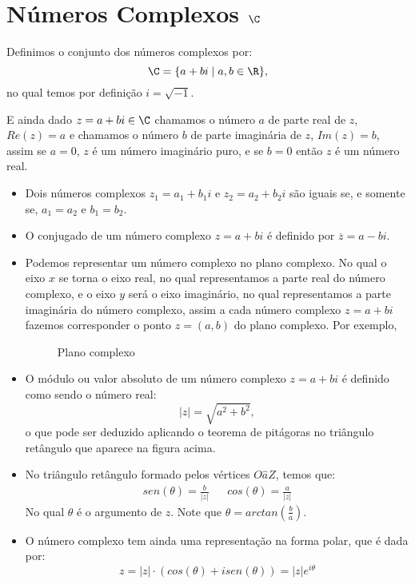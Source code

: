  \chapter{Números Complexos {$\C$}}

 \vskip0.3cm
 \colorbox{azul}{
 \begin{minipage}{14.5cm}
 \begin{center}
  Definimos o conjunto dos números complexos por:
 \[\C= \{a + bi \mid a, b \in \R \} ,\]
 no qual temos por definição $i= \sqrt{-1}$.
 \end{center}
 \end{minipage}}
 \vskip0.3cm

 E ainda dado $z= a+bi \in \C$ chamamos o número $a$ de parte real de $z$, $Re(z)= a$ e chamamos o número $b$ de parte imaginária de $z$, $Im(z)= b$, assim se $a=0$, $z$ é um número imaginário puro, e se $b=0$ então $z$ é um número real.

 \begin{defi}
 \begin{itemize}
 \item Dois números complexos $z_1= a_1 + b_1i$ e $z_2= a_2 + b_2i$ são iguais se, e somente se, $a_1=a_2$ e $b_1= b_2$.
 \item O conjugado de um número complexo $z= a+bi$ é definido por $\overline{z}= a - bi$.
 \item Podemos representar um número complexo no plano complexo. No qual o eixo $x$ se torna o eixo real, no qual representamos a parte real do número complexo, e o eixo $y$ será o eixo imaginário, no qual representamos a parte imaginária do número complexo, assim a cada número complexo $z= a+bi$ fazemos corresponder o ponto $z= (a, b)$ do plano complexo. Por exemplo,

 \begin{figure}[H]
   \centering
   \caption{Plano complexo}
  \end{figure}

 \item O módulo ou valor absoluto de um número complexo $z= a+bi$ é definido como sendo o número real:
 \[|z|= \sqrt{a^2 + b^2},\]
 o que pode ser deduzido aplicando o teorema de pitágoras no triângulo retângulo que aparece na figura acima.
 \item No triângulo retângulo formado pelos vértices $O\hat{a}Z$, temos que:
  \begin{align*}
 & sen(\theta)= \frac{b}{|z|} & & cos(\theta)= \frac{a}{|z|} &
 \end{align*}
 No qual $\theta$ é o argumento de $z$. Note que $\theta= arctan \left( \frac{b}{a} \right)$.

 \item O número complexo tem ainda uma representação na forma polar, que é dada por:
 \[z= |z|\cdot (cos(\theta) + i sen(\theta))= |z| e^{i \theta} \]

 \end{itemize}
 \end{defi}

